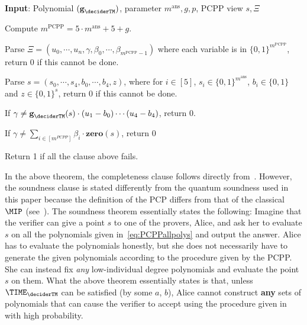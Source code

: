  \begin{algorithm}[H]
	\DontPrintSemicolon
	
	\textbf{Input}: Polynomial $(\textbf{g}_{\deciderTM})$, parameter $m^{\text{ans}},g, p$, PCPP view $s, \Xi$
	
	Compute $m^{\text{PCPP}} = 5\cdot m^{\text{ans}} + 5 +g$.
	
	Parse $\Xi = (u_0, \cdots, u_n, \gamma, \beta_0, \cdots, \beta_{m^{\text{PCPP}}-1})$ where each variable is in $\{0,1\}^{m^{\text{PCPP}}}$, return 0 if this cannot be done.
	
	Parse $s =(s_0, \cdots, s_4, b_0, \cdots, b_4, z)$, where for $i \in [5]$, $s_i \in \{0,1\}^{m^{\text{ans}}}$,  $b_i \in \{0,1\}$ and $z \in \{0,1\}^s$, return 0 if this cannot be done.
	
	If $\gamma \neq \textbf{g}_{\deciderTM}(s) \cdot (u_1 - b_0) \cdots (u_4 - b_4)$, return 0.
	
	If $\gamma \neq \sum_{i \in[m^{PCPP}]} \beta_i \cdot \textbf{zero}(s)$, return 0
	
	Return 1 if all the clause above fails. 
	
	\caption{$\mathtt{ValidatePCPP}(\textbf{g}_{\deciderTM}, m^{\text{ans}},g, p, s, \Xi)$, the validation algorithm for the PCPP procedure.}
	\label{pseu:validatePCPP}
\end{algorithm}


In the above theorem, the completeness clause follows directly from~. However, the soundness clause is stated differently from the quantum soundness used in this paper because the definition of the PCP differs from that of the classical $\MIP$ (see~\cite{aroraProofVerificationHardness1998}). The soundness theorem essentially states the following: Imagine that the verifier can give a point $s$ to one of the provers, Alice, and ask her to evaluate $s$ on all the polynomials given in~\eqref{eq:PCPPallpolys} and output the answer. Alice has to evaluate the polynomials honestly, but she does not necessarily have to generate the given polynomials according to the procedure given by the PCPP. She can instead fix \emph{any} low-individual degree polynomials and evaluate the point $s$ on them. What the above theorem essentially states is that, unless $\TIME_{\deciderTM}$ can be satisfied (by some $a$, $b$), Alice cannot construct \textbf{any} sets of polynomials that can cause the verifier to accept using the procedure given in~ with high probability. 



